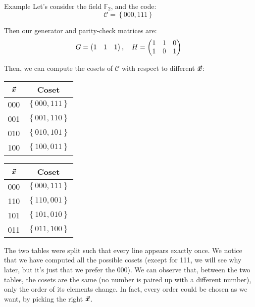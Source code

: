 \documentclass[a4paper]{article}
\begin{document}
\begin{parag}{Example}
    Let's consider the field $\mathbb{F}_2$, and the code: 
    \[\mathcal{C} = \left\{000, 111\right\}\]
    
    Then our generator and parity-check matrices are: 
    \[G = \begin{pmatrix} 1 & 1 & 1 \end{pmatrix}, \quad H = \begin{pmatrix} 1 & 1 & 0 \\ 1 & 0 & 1 \end{pmatrix} \]

    Then, we can compute the cosets of $\mathcal{C}$ with respect to different $\bm{\protect\vec{x}}$:
    \begin{center}
    \begin{tabular}{c|c}
        $\bm{\protect\vec{x}}$ & Coset \\
        \hline
        000 & $\left\{000, 111\right\}$ \\
        001 & $\left\{001, 110\right\}$ \\
        010 & $\left\{010, 101\right\}$  \\
        100 & $\left\{100, 011\right\}$
    \end{tabular}
    \hspace{1em}
    \begin{tabular}{c|c}
        $\bm{\protect\vec{x}}$ & Coset \\
        \hline
        000 & $\left\{000, 111\right\}$  \\
        110 & $\left\{110, 001\right\}$ \\
        101 & $\left\{101, 010\right\}$  \\
        011 & $\left\{011, 100\right\}$
    \end{tabular}
    \end{center}

    The two tables were split such that every line appears exactly once. We notice that we have computed all the possible cosets (except for 111, we will see why later, but it's just that we prefer the 000). We can observe that, between the two tables, the cosets are the same (no number is paired up with a different number), only the order of its elements change. In fact, every order could be chosen as we want, by picking the right $\bm{\protect\vec{x}}$.
\end{parag}
\end{document}
